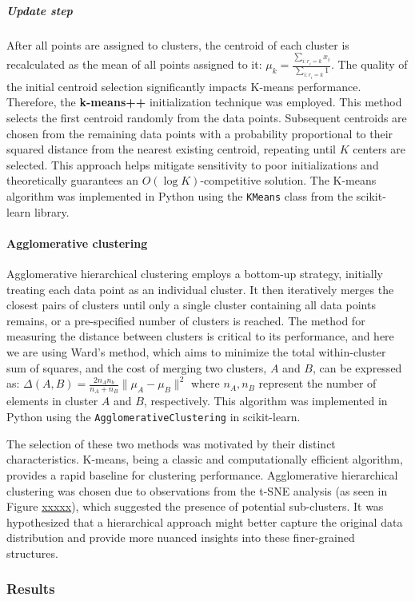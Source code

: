 \documentclass{article}
\begin{document}
\subparagraph{Update step} After all points are assigned to clusters, the centroid of each cluster is recalculated as the mean of all points assigned to it: $\mu_k = \frac{\sum_{i:r_i=k}^{} x_i}{\sum_{i:r_i=k}^{} 1}$. The quality of the initial centroid selection significantly impacts K-means performance. Therefore, the \textbf{k-means++} initialization technique was employed. This method selects the first centroid randomly from the data points. Subsequent centroids are chosen from the remaining data points with a probability proportional to their squared distance from the nearest existing centroid, repeating until $K$ centers are selected. This approach helps mitigate sensitivity to poor initializations and theoretically guarantees an $O(\log K)$-competitive solution. The K-means algorithm was implemented in Python using the \texttt{KMeans} class from the scikit-learn library.

\paragraph{Agglomerative clustering} Agglomerative hierarchical clustering employs a bottom-up strategy, initially treating each data point as an individual cluster. It then iteratively merges the closest pairs of clusters until only a single cluster containing all data points remains, or a pre-specified number of clusters is reached. The method for measuring the distance between clusters is critical to its performance, and here we are using Ward's method, which aims to minimize the total within-cluster sum of squares, and the cost of merging two clusters, $A$ and $B$, can be expressed as: $\Delta(A, B)=\frac{2n_An_b}{n_A+n_B}\|\mu_A-\mu_B\|^2$ where $n_A, n_B$ represent the number of elements in cluster $A$ and $B$, respectively. This algorithm was implemented in Python using the \texttt{AgglomerativeClustering} in scikit-learn.

The selection of these two methods was motivated by their distinct characteristics. K-means, being a classic and computationally efficient algorithm, provides a rapid baseline for clustering performance. Agglomerative hierarchical clustering was chosen due to observations from the t-SNE analysis (as seen in Figure \underline{xxxxx}), which suggested the presence of potential sub-clusters. It was hypothesized that a hierarchical approach might better capture the original data distribution and provide more nuanced insights into these finer-grained structures.

\subsubsection*{Results}
\end{document}
